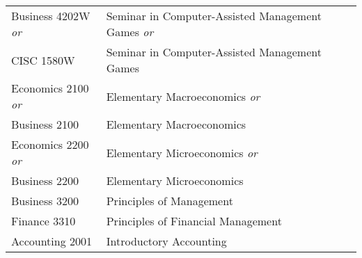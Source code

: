 \documentclass{article}
\begin{document}
\begin{Form}
\begin{longtable}{ |p{2.8cm}|p{6cm}|p{4.8cm}|p{2.3cm}|  }
						Business 4202W \emph{or} & Seminar in Computer-Assisted Management Games \emph{or} &  \TextField[name=4202W_instructor,width=4.8cm,charsize=8pt,bordercolor=1 1 1,borderstyle=U]{}    &  \TextField[name=4202W_grade,width=2.2cm,charsize=8pt,bordercolor=1 1 1]{{}}     \\
						
						CISC 1580W & Seminar in Computer-Assisted Management Games &   \TextField[name=1580W_instructor,width=4.8cm,charsize=8pt,bordercolor=1 1 1,borderstyle=U]{} &   \TextField[name=1580W_grade,width=2.2cm,charsize=8pt,bordercolor=1 1 1]{{}}    \\
						\hline
						
						Economics 2100 \emph{or} & Elementary Macroeconomics \emph{or} &  \TextField[name=2100a_instructor,width=4.8cm,charsize=8pt,bordercolor=1 1 1,borderstyle=U]{}    &  \TextField[name=2100a_grade,width=2.2cm,charsize=8pt,bordercolor=1 1 1]{{}}     \\
						
						Business 2100 & Elementary Macroeconomics &   \TextField[name=2100b_instructor,width=4.8cm,charsize=8pt,bordercolor=1 1 1,borderstyle=U]{} &   \TextField[name=2100b_grade,width=2.2cm,charsize=8pt,bordercolor=1 1 1]{{}}    \\
						\hline
						Economics 2200 \emph{or} & Elementary Microeconomics \emph{or} &  \TextField[name=2200a_instructor,width=4.8cm,charsize=8pt,bordercolor=1 1 1,borderstyle=U]{}    &  \TextField[name=2200a_grade,width=2.2cm,charsize=8pt,bordercolor=1 1 1]{{}}     \\
						
						Business 2200 & Elementary Microeconomics &   \TextField[name=2200b_instructor,width=4.8cm,charsize=8pt,bordercolor=1 1 1,borderstyle=U]{} &   \TextField[name=2200b_grade,width=2.2cm,charsize=8pt,bordercolor=1 1 1]{{}}    \\
						\hline
						
						Business 3200 & Principles of Management &   \TextField[name=3200_instructor,width=4.8cm,charsize=8pt,bordercolor=1 1 1,borderstyle=U]{}  &   \TextField[name=3200_grade,width=2.2cm,charsize=8pt,bordercolor=1 1 1]{{}}      \\
						\hline
						Finance 3310 & Principles of Financial Management &   \TextField[name=3310_instructor,width=4.8cm,charsize=8pt,bordercolor=1 1 1,borderstyle=U]{}  &   \TextField[name=3310_grade,width=2.2cm,charsize=8pt,bordercolor=1 1 1]{{}}      \\
						\hline
						Accounting 2001 &Introductory Accounting &   \TextField[name=2001_instructor,width=4.8cm,charsize=8pt,bordercolor=1 1 1,borderstyle=U]{}  &   \TextField[name=2001_grade,width=2.2cm,charsize=8pt,bordercolor=1 1 1]{{}}      \\
						\hline
					

\end{longtable}
\end{Form}
\end{document}
